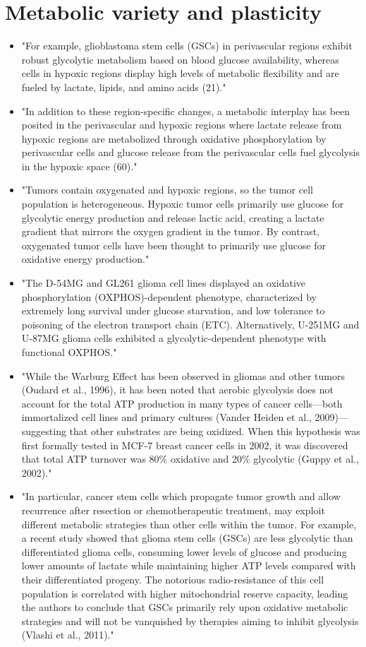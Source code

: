 \documentclass[11pt,a4paper]{article}
\begin{document}
\section{Metabolic variety and plasticity}
\begin{itemize}
\item "For example, glioblastoma stem cells (GSCs) in perivascular regions exhibit robust glycolytic metabolism based on blood glucose availability, whereas cells in hypoxic regions display high levels of metabolic flexibility and are fueled by lactate, lipids, and amino acids (21)."\cite{Chen2021}
\item "In addition to these region-specific changes, a metabolic interplay has been posited in the perivascular and hypoxic regions where lactate release from hypoxic regions are metabolized through oxidative phosphorylation by perivascular cells and glucose release from the perivascular cells fuel glycolysis in the hypoxic space (60)."\cite{Chen2021}
\item "Tumors contain oxygenated and hypoxic regions, so the tumor cell population is heterogeneous. Hypoxic tumor cells primarily use glucose for glycolytic energy production and release lactic acid, creating a lactate gradient that mirrors the oxygen gradient in the tumor. By contrast, oxygenated tumor cells have been thought to primarily use glucose for oxidative energy production."\cite{Sonveaux2009}
\item "The D-54MG and GL261 glioma cell lines displayed an oxidative phosphorylation (OXPHOS)-dependent phenotype, characterized by extremely long survival under glucose starvation, and low tolerance to poisoning of the electron transport chain (ETC). Alternatively, U-251MG and U-87MG glioma cells exhibited a glycolytic-dependent phenotype with functional OXPHOS."\cite{Griguer2005}
\item "While the Warburg Effect has been observed in gliomas and other tumors (Oudard et al., 1996), it has been noted that aerobic glycolysis does not account for the total ATP production in many types of cancer cells—both immortalized cell lines and primary cultures (Vander Heiden et al., 2009)—suggesting that other substrates are being oxidized. When this hypothesis was first formally tested in MCF-7 breast cancer cells in 2002, it was discovered that total ATP turnover was 80\% oxidative and 20\% glycolytic (Guppy et al., 2002)."\cite{Strickland2017}
\item "In particular, cancer stem cells which propagate tumor growth and allow recurrence after resection or chemotherapeutic treatment, may exploit different metabolic strategies than other cells within the tumor. For example, a recent study showed that glioma stem cells (GSCs) are less glycolytic than differentiated glioma cells, consuming lower levels of glucose and producing lower amounts of lactate while maintaining higher ATP levels compared with their differentiated progeny. The notorious radio-resistance of this cell population is correlated with higher mitochondrial reserve capacity, leading the authors to conclude that GSCs primarily rely upon oxidative metabolic strategies and will not be vanquished by therapies aiming to inhibit glycolysis (Vlashi et al., 2011)."\cite{Strickland2017}

\end{itemize}
\end{document}
